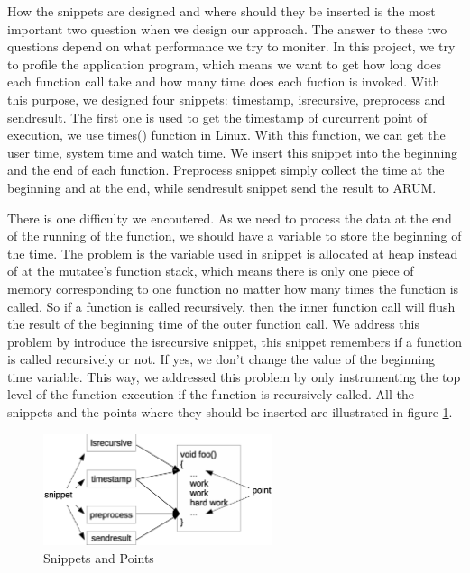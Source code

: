 \documentclass[11pt,letterpaper,oneside]{article}
\begin{document}
How the snippets are designed and where should they be inserted is the most important two question when we design our approach. The answer to these two questions depend on what performance we try to moniter. In this project, we try to profile the application program, which means we want to get how long does each function call take and how many time does each fuction is invoked. With this purpose, we designed four snippets: timestamp, isrecursive, preprocess and sendresult. The first one is used to get the timestamp of curcurrent point of execution, we use times() function in Linux. With this function, we can get the user time, system time and watch time. We insert this snippet into the beginning and the end of each function. Preprocess snippet simply collect the time at the beginning and at the end, while sendresult snippet send the result to ARUM.

There is one difficulty we encoutered. As we need to process the data at the end of the running of the function, we should have a variable to store the beginning of the time. The problem is the variable used in snippet is allocated at heap instead of at the mutatee's function stack, which means there is only one piece of memory corresponding to one function no matter how many times the function is called. So if a function is called recursively, then the inner function call will flush the result of the beginning time of the outer function call. We address this problem by introduce the isrecursive snippet, this snippet remembers if a function is called recursively or not. If yes, we don't change the value of the beginning time variable. This way, we addressed this problem by only instrumenting the top level of the function execution if the function is recursively called. All the snippets and the points where they should be inserted are illustrated in figure \ref{fig:snippet}.

\begin{figure}
\begin{center}
\includegraphics[width=0.6\textwidth]{snippet.eps}
\caption{Snippets and Points}
\label{fig:snippet}
\end{center}
\end{figure}
\end{document}
